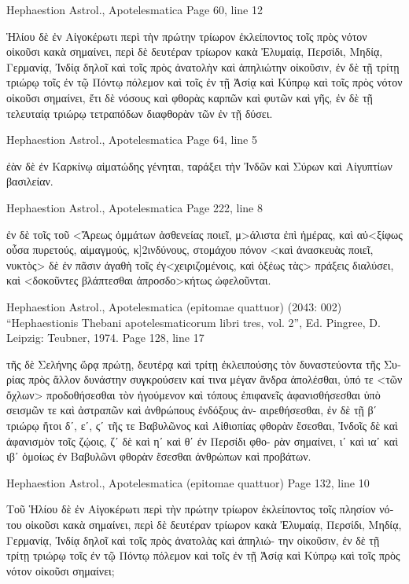 \documentclass[12pt,letterpaper,twoside,final]{memoir}
\begin{document}
\begin{greek}
Hephaestion Astrol., Apotelesmatica 
Page 60, line 12

Ἡλίου δὲ ἐν Αἰγοκέρωτι περὶ τὴν πρώτην τρίωρον 
ἐκλείποντος τοῖς πρὸς νότον οἰκοῦσι κακὰ σημαίνει, 
περὶ δὲ δευτέραν τρίωρον κακὰ Ἐλυμαίᾳ, Περσίδι, 
Μηδίᾳ, Γερμανίᾳ, Ἰνδίᾳ δηλοῖ καὶ τοῖς πρὸς ἀνατολὴν καὶ 
ἀπηλιώτην οἰκοῦσιν, ἐν δὲ τῇ τρίτῃ τριώρῳ τοῖς ἐν τῷ 
Πόντῳ πόλεμον καὶ τοῖς ἐν τῇ Ἀσίᾳ καὶ Κύπρῳ καὶ 
τοῖς πρὸς νότον οἰκοῦσι σημαίνει, ἔτι δὲ νόσους καὶ 
φθορὰς καρπῶν καὶ φυτῶν καὶ γῆς, ἐν δὲ τῇ τελευταίᾳ 
τριώρῳ τετραπόδων διαφθορὰν τῶν ἐν τῇ δύσει. 



Hephaestion Astrol., Apotelesmatica 
Page 64, line 5

           ἐὰν δὲ ἐν Καρκίνῳ αἱματώδης γένηται, ταράξει 
τὴν Ἰνδῶν καὶ Σύρων καὶ Αἰγυπτίων βασιλείαν. 



Hephaestion Astrol., Apotelesmatica 
Page 222, line 8

                                                     ἐν δὲ τοῖς τοῦ 
<Ἄρεως ὀμμάτων ἀσθενείας ποιεῖ, μ>άλιστα ἐπὶ ἡμέρας, 
καὶ αὐ<ξίφως οὖσα πυρετούς, αἱμαγμούς, κ]2ινδύνους, 
στομάχου πόνον <καὶ ἀνασκευὰς ποιεῖ, νυκτὸς> δὲ ἐν 
πᾶσιν ἀγαθὴ τοῖς ἐγ<χειριζομένοις, καὶ ὀξέως τὰς> πράξεις 
διαλύσει, καὶ <δοκοῦντες βλάπτεσθαι ἀπροσδο>κήτως 
ὠφελοῦνται. 



Hephaestion Astrol., Apotelesmatica (epitomae quattuor) (2043: 002)
“Hephaestionis Thebani apotelesmaticorum libri tres, vol. 2”, Ed. Pingree, D.
Leipzig: Teubner, 1974.
Page 128, line 17

                                   τῆς δὲ Σελήνης ὥρᾳ πρώτῃ, 
δευτέρᾳ καὶ τρίτῃ ἐκλειπούσης τὸν δυναστεύοντα τῆς 
Συρίας πρὸς ἄλλον δυνάστην συγκρούσειν καί τινα μέγαν 
ἄνδρα ἀπολέσθαι, ὑπό τε <τῶν ὄχλων> προδοθήσεσθαι 
τὸν ἡγούμενον καὶ τόπους ἐπιφανεῖς ἀφανισθήσεσθαι ὑπὸ 
σεισμῶν τε καὶ ἀστραπῶν καὶ ἀνθρώπους ἐνδόξους ἀν-
αιρεθήσεσθαι, ἐν δὲ τῇ βʹ τριώρῳ ἤτοι δʹ, εʹ, ϛʹ τῆς τε 
Βαβυλῶνος καὶ Αἰθιοπίας φθορὰν ἔσεσθαι, Ἰνδοῖς δὲ καὶ 
ἀφανισμὸν τοῖς ζῴοις, ζʹ δὲ καὶ ηʹ καὶ θʹ ἐν Περσίδι φθο-
ρὰν σημαίνει, ιʹ καὶ ιαʹ καὶ ιβʹ ὁμοίως ἐν Βαβυλῶνι φθορὰν 
ἔσεσθαι ἀνθρώπων καὶ προβάτων. 



Hephaestion Astrol., Apotelesmatica (epitomae quattuor) 
Page 132, line 10

Τοῦ Ἡλίου δὲ ἐν Αἰγοκέρωτι περὶ τὴν πρώτην τρίωρον 
ἐκλείποντος τοῖς πλησίον νότου οἰκοῦσι κακὰ σημαίνει, 
περὶ δὲ δευτέραν τρίωρον κακὰ Ἐλυμαίᾳ, Περσίδι, Μηδίᾳ, 
Γερμανίᾳ, Ἰνδίᾳ δηλοῖ καὶ τοῖς πρὸς ἀνατολὰς καὶ ἀπηλιώ-
την οἰκοῦσιν, ἐν δὲ τῇ τρίτῃ τριώρῳ τοῖς ἐν τῷ Πόντῳ 
πόλεμον καὶ τοῖς ἐν τῇ Ἀσίᾳ καὶ Κύπρῳ καὶ τοῖς πρὸς νότον 
οἰκοῦσι σημαίνει; 




\end{greek}
\end{document}

